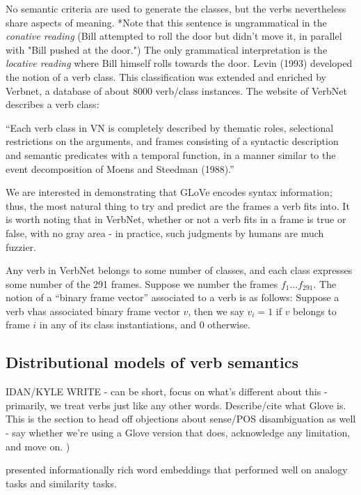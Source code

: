 \documentclass[11pt,a4paper]{article}
\begin{document}
No semantic criteria are used to generate the classes, but the verbs nevertheless share aspects of meaning.  *Note that this sentence is ungrammatical in the \emph{conative reading} (Bill attempted to roll the door but didn't move it, in parallel with "Bill pushed at the door.") The only grammatical interpretation is the \emph{locative reading} where Bill himself rolls towards the door. 
\cite{10.2307/41217861}
Levin (1993) developed the notion of a verb class. This classification was extended and enriched by Verbnet, a database of about 8000 verb/class instances. The website of VerbNet describes a verb class:

\begin{displayquote}
	“Each verb class in VN is completely described by thematic roles, selectional restrictions on the arguments, and frames consisting of a syntactic description and semantic predicates with a temporal function, in a manner similar to the event decomposition of Moens and Steedman (1988).”
\end{displayquote}

We are interested in demonstrating that GLoVe encodes syntax information; thus, the most natural thing to try and predict are the frames a verb fits into. It is worth noting that in VerbNet, whether or not a verb fits in a frame is true or false, with no gray area - in practice, such judgments by humans are much fuzzier. 


Any verb in VerbNet belongs to some number of classes, and each class expresses some number of the 291 frames. Suppose we number the frames $f_1... f_{291}$. The notion of a “binary frame vector” associated to a verb is as follows: Suppose a verb vhas associated binary frame vector $v$, then we say 
$v_i =1$ if $v$ belongs to frame $i$ in any of its class instantiations, and 0 otherwise.

\subsection{Distributional models of verb semantics}

IDAN/KYLE WRITE - can be short, focus on what's different about this - primarily, we treat verbs just like any other words. Describe/cite what Glove is. This is the section to head off objections about sense/POS disambiguation as well - say whether we're using a Glove version that does, acknowledge any limitation, and move on. )

\cite{pennington2014glove} presented informationally rich word embeddings that performed well on analogy tasks and similarity tasks. 
\end{document}
